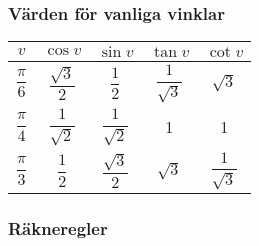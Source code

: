\documentclass{article}
\begin{document}
\subsubsection{Värden för vanliga vinklar}
\begin{tabular}{c|c|c|c|c}
$v$ & $\cos v$ & $\sin v$ & $\tan v$ & $\cot v$ \\
\hline
$\dfrac{\pi}{6}$ & $\dfrac{\sqrt{3}}{2}$ & $\dfrac{1}{2}$ & $\dfrac{1}{\sqrt{3}}$  & $\sqrt{3}$\\
\hline
$\dfrac{\pi}{4}$ & $\dfrac{1}{\sqrt{2}}$ & $\dfrac{1}{\sqrt{2}}$ & 1 & 1\\
\hline
$\dfrac{\pi}{3}$ & $\dfrac{1}{2}$ & $\dfrac{\sqrt{3}}{2}$ & $\sqrt{3}$ & $\dfrac{1}{\sqrt{3}}$
\end{tabular}
\subsubsection{Räkneregler}
\end{document}
